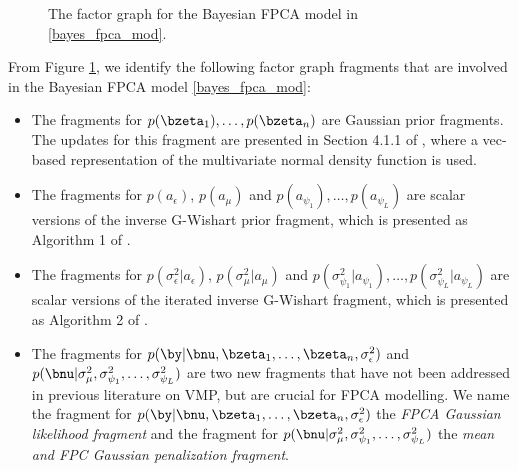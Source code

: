 \documentclass[12pt]{article}
\def\sigsqeps{\sigma^2_{\epsilon}}
\def\aeps{a_{\epsilon}}
\def\sigsqmu{\sigma^2_{\mu}}
\def\amu{a_{\mu}}
\newcommand\sigsqpsi[1]{\sigma^2_{\psi_{#1}}}
\newcommand\apsi[1]{a_{\psi_{#1}}}
\theoremstyle{plain}
\theoremstyle{definition}
\theoremstyle{remark}
\begin{document}
\begin{figure}
\caption{The factor graph for the Bayesian FPCA model in \eqref{bayes_fpca_mod}.}
\label{fig:fg_fpca}
\end{figure}

From Figure \ref{fig:fg_fpca}, we identify the following factor graph fragments that are involved in the Bayesian
FPCA model \eqref{bayes_fpca_mod}:

\begin{itemize}
	\item The fragments for $p (\bzeta_1), \dots, p(\bzeta_n)$ are Gaussian prior fragments. The updates for
	this fragment are presented in Section 4.1.1 of , where a vec-based representation of the
	multivariate normal density function is used.
	\item The fragments for $p (\aeps)$, $p (\amu)$ and $p (\apsi{1}), \dots, p (\apsi{L})$ are scalar versions
	of the inverse G-Wishart prior fragment, which is presented as Algorithm 1 of .
	\item The fragments for $p (\sigsqeps | \aeps)$, $p (\sigsqmu | \amu)$ and $p (\sigsqpsi{1} | \apsi{1}), \dots,
	p (\sigsqpsi{L} | \apsi{L})$ are scalar versions of the iterated inverse G-Wishart fragment, which is presented
	as Algorithm 2 of .
	\item The fragments for $p (\by | \bnu, \bzeta_1, \dots, \bzeta_n, \sigsqeps)$ and $p (\bnu | \sigsqmu,
	\sigsqpsi{1}, \dots, \sigsqpsi{L})$ are two new fragments that have not been addressed in previous literature
	on VMP, but are crucial for FPCA modelling.
	We name the fragment for $p (\by | \bnu, \bzeta_1, \dots, \bzeta_n, \sigsqeps)$ the \emph{FPCA
	Gaussian likelihood fragment} and the fragment for $p (\bnu | \sigsqmu, \sigsqpsi{1}, \dots, \sigsqpsi{L})$
	the \emph{mean and FPC Gaussian penalization fragment}.
\end{itemize}
\end{document}
